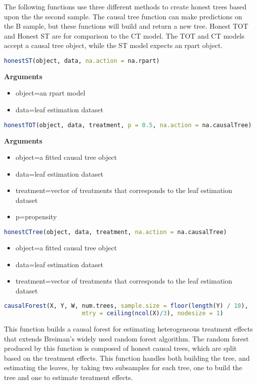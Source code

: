 \documentclass{article}
\begin{document}
The following  functions use three different methods to create honest trees based upon the the second sample. The causal tree function can make predictions on the B sample, but these functions will build and return a new tree. 
Honest TOT and Honest ST are for comparison to the CT model. The TOT and CT models accept a causal tree object, while the ST model expects an rpart object.

\begin{lstlisting}[language=R]
honestST(object, data, na.action = na.rpart) 
\end{lstlisting}
\textbf{Arguments} \\
\begin{itemize}
  \item object=an rpart model
  \item data=leaf estimation dataset 
 \end{itemize}


\begin{lstlisting}[language=R]
honestTOT(object, data, treatment, p = 0.5, na.action = na.causalTree) 
\end{lstlisting}
\textbf{Arguments} \\
\begin{itemize}
  \item object=a fitted causal tree object
  \item data=leaf estimation dataset 
  \item treatment=vector of treatments that corresponds to the leaf estimation dataset
  \item p=propensity 
 \end{itemize}
 
\begin{lstlisting}[language=R]
honestCTree(object, data, treatment, na.action = na.causalTree)
\end{lstlisting}
\begin{itemize}
  \item object=a fitted causal tree object
  \item data=leaf estimation dataset
  \item treatment=vector of treatments that corresponds to the leaf estimation dataset
 \end{itemize}
 

 \begin{lstlisting}[language=R]
causalForest(X, Y, W, num.trees, sample.size = floor(length(Y) / 10), 
                      mtry = ceiling(ncol(X)/3), nodesize = 1)
\end{lstlisting}
This function builds a causal forest for estimating heterogeneous treatment effects that extends Breiman's widely used random forest algorithm. The random forest produced by this function is composed of honest causal trees, which are split based on the treatment effects. This function handles both building the tree, and estimating the leaves, by taking two subsamples for each tree, one to build the tree and one to estimate treatment effects.
\end{document}
